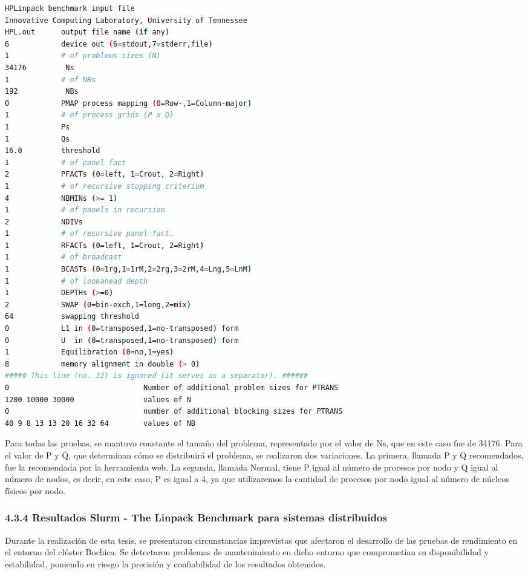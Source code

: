 \begin{spacing}{1.5}
  \begin{lstlisting}[language=bash]
      HPLinpack benchmark input file
Innovative Computing Laboratory, University of Tennessee
HPL.out      output file name (if any)
6            device out (6=stdout,7=stderr,file)
1            # of problems sizes (N)
34176         Ns
1            # of NBs
192           NBs
0            PMAP process mapping (0=Row-,1=Column-major)
1            # of process grids (P x Q)
1            Ps
1            Qs
16.0         threshold
1            # of panel fact
2            PFACTs (0=left, 1=Crout, 2=Right)
1            # of recursive stopping criterium
4            NBMINs (>= 1)
1            # of panels in recursion
2            NDIVs
1            # of recursive panel fact.
1            RFACTs (0=left, 1=Crout, 2=Right)
1            # of broadcast
1            BCASTs (0=1rg,1=1rM,2=2rg,3=2rM,4=Lng,5=LnM)
1            # of lookahead depth
1            DEPTHs (>=0)
2            SWAP (0=bin-exch,1=long,2=mix)
64           swapping threshold
0            L1 in (0=transposed,1=no-transposed) form
0            U  in (0=transposed,1=no-transposed) form
1            Equilibration (0=no,1=yes)
8            memory alignment in double (> 0)
##### This line (no. 32) is ignored (it serves as a separator). ######
0                               Number of additional problem sizes for PTRANS
1200 10000 30000                values of N
0                               number of additional blocking sizes for PTRANS
40 9 8 13 13 20 16 32 64        values of NB

\end{lstlisting}

  Para todas las pruebas, se mantuvo constante el tamaño del problema, representado por el valor de Ns, que en este caso fue de 34176. Para el valor de P y Q, que determinan cómo se distribuirá el problema, se realizaron dos variaciones. La primera, llamada P y Q recomendados, fue la recomendada por la herramienta web. La segunda, llamada Normal, tiene P igual al número de procesos por nodo y Q igual al número de nodos, es decir, en este caso, P es igual a 4, ya que utilizaremos la cantidad de procesos por nodo igual al número de núcleos físicos por nodo.

  \subsubsection{4.3.4 Resultados Slurm - The Linpack Benchmark para sistemas distribuidos}

  Durante la realización de esta tesis, se presentaron circunstancias imprevistas que afectaron el desarrollo de las pruebas de rendimiento en el entorno del clúster Bochica. Se detectaron problemas de mantenimiento en dicho entorno que comprometían su disponibilidad y estabilidad, poniendo en riesgo la precisión y confiabilidad de los resultados obtenidos.


\end{spacing}
